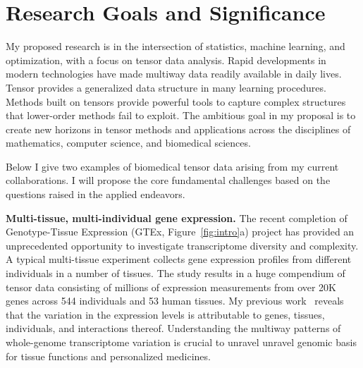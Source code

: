 \documentclass[11pt]{article}
\theoremstyle{exampstyle}
\theoremstyle{definition}
\begin{document}
\section{Research Goals and Significance}
\vspace{-.5cm}
My proposed research is in the intersection of statistics, machine learning, and optimization, with a focus on tensor data analysis. Rapid developments in modern technologies have made multiway data readily available in daily lives. Tensor provides a generalized data structure in many learning procedures. Methods built on tensors provide powerful tools to capture complex structures that lower-order methods fail to exploit. The ambitious goal in my proposal is to create new horizons in tensor methods and applications across the disciplines of mathematics, computer science, and biomedical sciences.  

\setlength{\abovedisplayskip}{6.5pt}
\setlength{\belowdisplayskip}{6pt}


Below I give two examples of biomedical tensor data arising from my current collaborations. I will propose the core fundamental challenges based on the questions raised in the applied endeavors.

{\bf Multi-tissue, multi-individual gene expression.} The recent completion of Genotype-Tissue Expression (GTEx, Figure~\ref{fig:intro}a) project has provided an unprecedented opportunity to investigate transcriptome diversity and complexity. A typical multi-tissue experiment collects gene expression profiles from different individuals in a number of tissues.  The study results in a huge compendium of tensor data consisting of millions of expression measurements from over 20K genes across 544 individuals and 53 human tissues. My previous work~\cite{wang2019three} reveals that the variation in the expression levels is attributable to genes, tissues, individuals, and interactions thereof. Understanding the multiway patterns of whole-genome transcriptome variation is crucial to unravel unravel genomic basis for tissue functions and personalized medicines.
\end{document}
